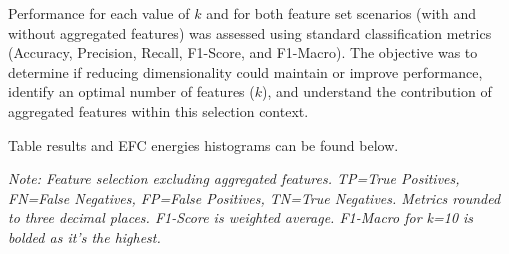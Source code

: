 \documentclass[12pt]{article}
\begin{document}
Performance for each value of $k$ and for both feature set scenarios (with and without aggregated features) was assessed
using standard classification metrics (Accuracy, Precision, Recall, F1-Score, and F1-Macro). The objective was to
determine if reducing dimensionality could maintain or improve performance, identify an optimal number of features ($k$),
and understand the contribution of aggregated features within this selection context.

Table results and EFC energies histograms can be found below.

\begin{table}[htbp] %
  \centering
  \caption{EFC Performance with Feature Selection (Aggregated Features Excluded) for Varying k (Experiment 2a).}
  \label{tab:fs_excluded_agg_results}
  \par\medskip
  \footnotesize
  \textit{Note: Feature selection excluding aggregated features. TP=True Positives, FN=False Negatives, FP=False Positives,
  TN=True Negatives. Metrics rounded to three decimal places. F1-Score is weighted average. F1-Macro for k=10 is bolded
  as it's the highest.}
\end{table}
\end{document}
